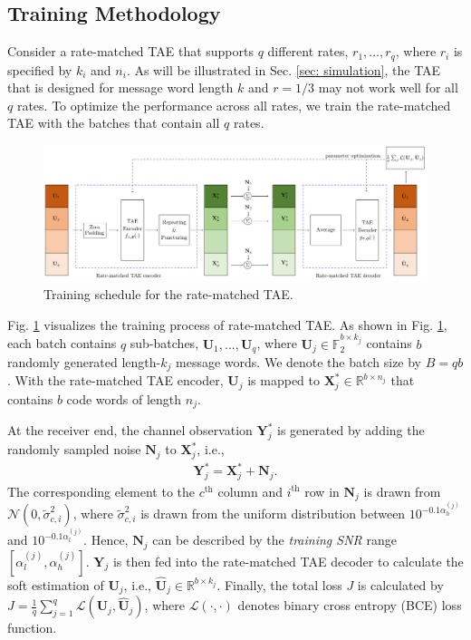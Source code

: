 \documentclass [PhD] {uclathes}
\begin{document}
\subsection{Training Methodology}
Consider a rate-matched TAE that supports $q$ different rates, $r_1,\ldots, r_q$, where $r_i$ is specified by $k_i$ and $n_i$. As will be illustrated in Sec. \ref{sec: simulation}, the TAE that is designed  for message word length $k$ and $r=1/3$ may not work well for all $q$ rates. To optimize the performance across all rates, we train the rate-matched TAE with the batches that contain all $q$ rates.
\begin{figure}[t] 
    \centering
      \includegraphics[width=1\linewidth]{figures/training_process.pdf}
      \caption{Training schedule for the rate-matched TAE.}
      \label{fig: training_process}
\end{figure}
Fig. \ref{fig: training_process} visualizes the training process of rate-matched TAE. As shown in Fig. \ref{fig: training_process}, each batch contains $q$ sub-batches, $\mathbf{U}_1,\ldots, \mathbf{U}_q$, where $\mathbf{U}_j\in\mathbb{F}_2^{b\times k_j}$ contains $b$ randomly generated length-$k_j$ message words. We denote the batch size by $B=qb$. With the rate-matched TAE encoder, $\mathbf{U}_j$ is mapped to $\mathbf{X}^*_j\in\mathbb{R}^{b\times n_j}$ that contains $b$ code words of length $n_j$.

At the receiver end, the channel observation $\mathbf{Y}^*_{j}$ is generated by adding the randomly sampled noise $\mathbf{N}_j$ to $\mathbf{X}^*_j$, i.e.,
\begin{align}
    \mathbf{Y}^{*}_j=\mathbf{X}^{*}_j+\mathbf{N}_j.
\end{align}
The corresponding element to the $c^{\text{th}}$ column and $i^{\text{th}}$ row  in $\mathbf{N}_j$ is drawn from $\mathcal{N}(0,\tilde{\sigma}_{c,i}^2)$, where $\tilde{\sigma}_{c,i}^2$ is drawn from the uniform distribution between $10^{-0.1\alpha^{(j)}_{h}}$ and $10^{-0.1\alpha^{(j)}_{l}}$. Hence, $\mathbf{N}_j$ can be described by the \textit{training SNR} range $[\alpha_{l}^{(j)},\alpha_{h}^{(j)}]$. $\mathbf{Y}_j$ is then fed into the rate-matched TAE decoder to calculate the soft estimation of $\mathbf{U}_j$, i.e., $\hat{\mathbf{U}}_j\in\mathbb{R}^{b\times k_j}$. Finally, the total loss $J$ is calculated by $J=\frac{1}{q}\sum_{j=1}^{q}\mathcal{L}(\mathbf{U}_j,\hat{\mathbf{U}}_j)$, where $\mathcal{L}(\cdot,\cdot)$ denotes binary cross entropy (BCE) loss function.
\end{document}
